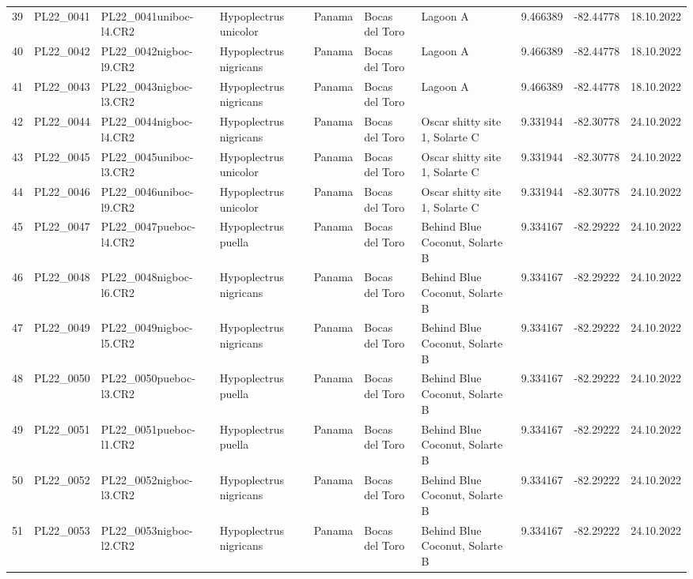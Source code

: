 \begin{table}[ht]
\begin{tabular}{rlllllllll}
  39 & PL22\_0041 & PL22\_0041uniboc-l4.CR2 & Hypoplectrus unicolor & Panama & Bocas del Toro & Lagoon A & 9.466389 & -82.44778 & 18.10.2022 \\ 
  40 & PL22\_0042 & PL22\_0042nigboc-l9.CR2 & Hypoplectrus nigricans  & Panama & Bocas del Toro & Lagoon A & 9.466389 & -82.44778 & 18.10.2022 \\ 
  41 & PL22\_0043 & PL22\_0043nigboc-l3.CR2 & Hypoplectrus nigricans  & Panama & Bocas del Toro & Lagoon A & 9.466389 & -82.44778 & 18.10.2022 \\ 
  42 & PL22\_0044 & PL22\_0044nigboc-l4.CR2 & Hypoplectrus nigricans  & Panama & Bocas del Toro & Oscar shitty site 1, Solarte C & 9.331944 & -82.30778 & 24.10.2022 \\ 
  43 & PL22\_0045 & PL22\_0045uniboc-l3.CR2 & Hypoplectrus unicolor & Panama & Bocas del Toro & Oscar shitty site 1, Solarte C & 9.331944 & -82.30778 & 24.10.2022 \\ 
  44 & PL22\_0046 & PL22\_0046uniboc-l9.CR2 & Hypoplectrus unicolor & Panama & Bocas del Toro & Oscar shitty site 1, Solarte C & 9.331944 & -82.30778 & 24.10.2022 \\ 
  45 & PL22\_0047 & PL22\_0047pueboc-l4.CR2 & Hypoplectrus puella & Panama & Bocas del Toro & Behind Blue Coconut, Solarte B & 9.334167 & -82.29222 & 24.10.2022 \\ 
  46 & PL22\_0048 & PL22\_0048nigboc-l6.CR2 & Hypoplectrus nigricans  & Panama & Bocas del Toro & Behind Blue Coconut, Solarte B & 9.334167 & -82.29222 & 24.10.2022 \\ 
  47 & PL22\_0049 & PL22\_0049nigboc-l5.CR2 & Hypoplectrus nigricans  & Panama & Bocas del Toro & Behind Blue Coconut, Solarte B & 9.334167 & -82.29222 & 24.10.2022 \\ 
  48 & PL22\_0050 & PL22\_0050pueboc-l3.CR2 & Hypoplectrus puella & Panama & Bocas del Toro & Behind Blue Coconut, Solarte B & 9.334167 & -82.29222 & 24.10.2022 \\ 
  49 & PL22\_0051 & PL22\_0051pueboc-l1.CR2 & Hypoplectrus puella & Panama & Bocas del Toro & Behind Blue Coconut, Solarte B & 9.334167 & -82.29222 & 24.10.2022 \\ 
  50 & PL22\_0052 & PL22\_0052nigboc-l3.CR2 & Hypoplectrus nigricans  & Panama & Bocas del Toro & Behind Blue Coconut, Solarte B & 9.334167 & -82.29222 & 24.10.2022 \\ 
  51 & PL22\_0053 & PL22\_0053nigboc-l2.CR2 & Hypoplectrus nigricans  & Panama & Bocas del Toro & Behind Blue Coconut, Solarte B & 9.334167 & -82.29222 & 24.10.2022 \\ 

\end{tabular}
\end{table}
